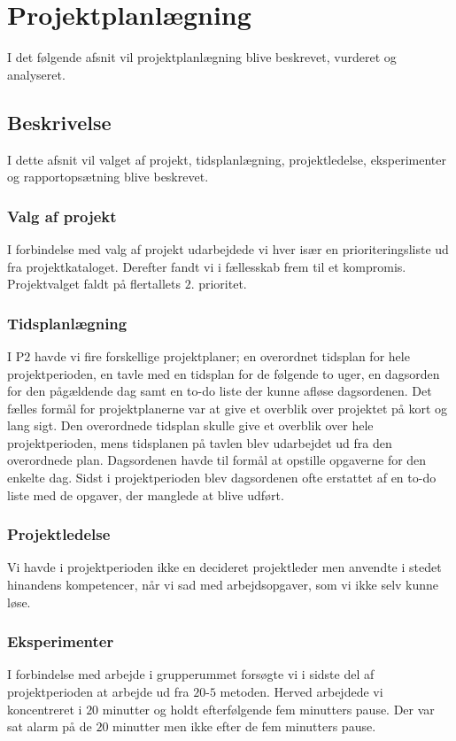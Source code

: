 \chapter{Projektplanlægning}
I det følgende afsnit vil projektplanlægning blive beskrevet, vurderet og analyseret. 

\section{Beskrivelse}
I dette afsnit vil valget af projekt, tidsplanlægning, projektledelse, eksperimenter og rapportopsætning blive beskrevet.

\subsection{Valg af projekt}
I forbindelse med valg af projekt udarbejdede vi hver især en prioriteringsliste ud fra projektkataloget. Derefter fandt vi i fællesskab frem til et kompromis. Projektvalget faldt på flertallets $2$. prioritet.

\subsection{Tidsplanlægning}
I P$2$ havde vi fire forskellige projektplaner; en overordnet tidsplan for hele projektperioden, en tavle med en tidsplan for de følgende to uger, en dagsorden for den pågældende dag samt en to-do liste der kunne afløse dagsordenen. 
Det fælles formål for projektplanerne var at give et overblik over projektet på kort og lang sigt.
Den overordnede tidsplan skulle give et overblik over hele projektperioden, mens tidsplanen på tavlen blev udarbejdet ud fra den overordnede plan. Dagsordenen havde til formål at opstille opgaverne for den enkelte dag. Sidst i projektperioden blev dagsordenen ofte erstattet af en to-do liste med de opgaver, der manglede at blive udført.

\subsection{Projektledelse}
Vi havde i projektperioden ikke en decideret projektleder men anvendte i stedet hinandens kompetencer, når vi sad med arbejdsopgaver, som vi ikke selv kunne løse.

\subsection{Eksperimenter}
I forbindelse med arbejde i grupperummet forsøgte vi i sidste del af projektperioden at arbejde ud fra $20$-$5$ metoden. Herved arbejdede vi koncentreret i $20$ minutter og holdt efterfølgende fem minutters pause. Der var sat alarm på de $20$ minutter men ikke efter de fem minutters pause. 

